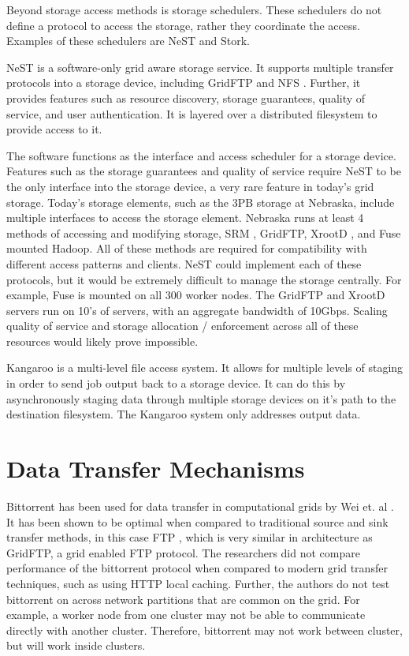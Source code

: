 Beyond storage access methods is storage schedulers.  These schedulers do not define a protocol to access the storage, rather they coordinate the access.  Examples of these schedulers are NeST and Stork.

NeST \cite{bent2002flexibility} is a software-only grid aware storage service.  It supports multiple transfer protocols into a storage device, including GridFTP \cite{allcock2005globus} and NFS \cite{walsh1985overview}.  Further, it provides features such as resource discovery, storage guarantees, quality of service, and user authentication.  It is layered over a distributed filesystem to provide access to it.

The software functions as the interface and access scheduler for a storage device.  Features such as the storage guarantees and quality of service require NeST to be the only interface into the storage device, a very rare feature in today's grid storage.  Today's storage elements, such as the 3PB storage at Nebraska, include multiple interfaces to access the storage element.  Nebraska runs at least 4 \cite{attebury2009hadoop} methods of accessing and modifying storage, SRM \cite{shoshani2002storage}, GridFTP, XrootD \cite{dorigo2005xrootd}, and Fuse \cite{szeredi2010fuse} mounted Hadoop.  All of these methods are required for compatibility with different access patterns and clients.  NeST could implement each of these protocols, but it would be extremely difficult to manage the storage centrally.  For example, Fuse is mounted on all 300 worker nodes.  The GridFTP and XrootD servers run on 10's of servers, with an aggregate bandwidth of 10Gbps.  Scaling quality of service and storage allocation / enforcement across all of these resources would likely prove impossible.

Kangaroo \cite{thain2001kangaroo} is a multi-level file access system.  It allows for multiple levels of staging in order to send job output back to a storage device.  It can do this by asynchronously staging data through multiple storage devices on it's path to the destination filesystem.  The Kangaroo system only addresses output data.

\section{Data Transfer Mechanisms}

Bittorrent has been used for data transfer in computational grids by Wei et. al \cite{wei2005collaborative, wei2005scheduling, wei2007towards}.  It has been shown to be optimal when compared to traditional source and sink transfer methods, in this case FTP \cite{postel1985file}, which is very similar in architecture as GridFTP, a grid enabled FTP protocol.  The researchers did not compare performance of the bittorrent protocol when compared to modern grid transfer techniques, such as using HTTP local caching.  Further, the authors do not test bittorrent on across network partitions that are common on the grid.  For example, a worker node from one cluster may not be able to communicate directly with another cluster.  Therefore, bittorrent may not work between cluster, but will work inside clusters.


